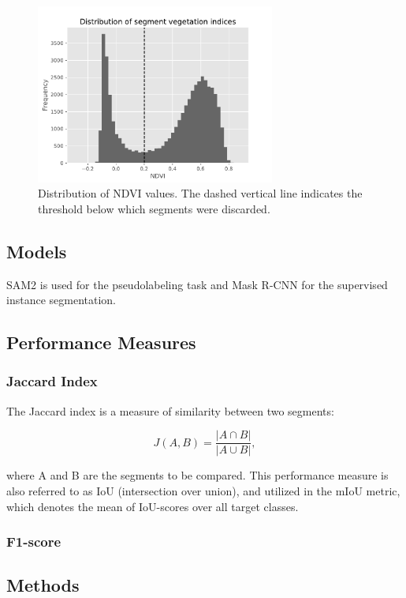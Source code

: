\documentclass[english, 12pt, a4paper, sci, utf8, a-2b, online]{aaltothesis}
\begin{document}
\begin{enumerate}
\begin{end}
\begin{figure}[h]
    \centering
    \includegraphics[width=0.7\textwidth]{figures/ndvi.pdf}
    \caption{Distribution of NDVI values. The dashed vertical line indicates the threshold below which segments were discarded.}
    \label{fig:ndvi}
\end{figure}

\subsection{Models}

SAM2 is used for the pseudolabeling task and Mask R-CNN \cite{maskrcnn} for the supervised instance segmentation.

\subsection{Performance Measures}

\subsubsection{Jaccard Index}

The Jaccard index\cite{jaccard} is a measure of similarity between two segments:

$$
J(A, B) = \frac{|A \cap B|}{|A \cup B |},
$$

where A and B are the segments to be compared. This performance measure is also referred to as IoU (intersection over union), and utilized in the mIoU metric, which denotes the mean of IoU-scores over all target classes.

\subsubsection{F1-score}

\subsection{Methods}


\end{end}
\end{enumerate}
\end{document}
